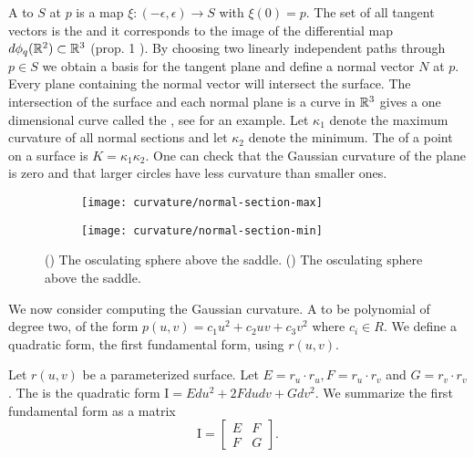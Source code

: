 A  to $S$ at $p$ is a map $\xi:(-\epsilon,\epsilon)\to S$ with $\xi(0)=p$.
The set of all tangent vectors is the  and it corresponds to the image
of the differential map $d\phi_q(\mathbb{R}^2)\subset \mathbb{R}^3$ (prop. 1 \cite{doc76}).
By choosing two linearly independent paths through $p\in S$ we obtain a basis 
for the tangent
plane and define a normal vector $N$ at $p$.
Every plane containing the normal vector will intersect the surface.
The intersection of the surface and each normal plane is a curve in $\mathbb{R}^3$
gives a one dimensional curve called the , see  
for an example.
Let $\kappa_1$ denote the maximum curvature of all normal sections 
and let $\kappa_2$ denote the minimum. 
The  of a point on a surface is
$K=\kappa_1\kappa_2.$
One can check that the Gaussian curvature of the plane is zero and
that larger circles have less curvature than smaller ones.



\begin{figure}[htb]
    \captionsetup[subfigure]{justification=centering}
    \centering
    \begin{subfigure}[b]{0.25\textwidth}
        \texttt{[image: curvature/normal-section-max]}
       \subcaption{}\label{fig:normal-section-max}
    \end{subfigure}
        \hspace{1cm}
        \begin{subfigure}[b]{0.25\textwidth}
        \texttt{[image: curvature/normal-section-min]}
        \subcaption{}\label{fig:normal-section-min}
        \end{subfigure}
    \caption{() The osculating sphere above the saddle.
        () The osculating sphere above the saddle.
    }
    \label{fig:normal-sections}
\end{figure}


We now consider computing the Gaussian curvature.
A  to be polynomial of degree two, of the form $p(u,v)=c_1u^2+c_2uv+c_3v^2$ 
where $c_i\in R$.
We define a quadratic form, the first fundamental form, using $r(u,v)$.

Let $r(u,v)$ be a parameterized surface.
Let $E=r_u\cdot r_u, F=r_u\cdot r_v$ and  $G=r_v\cdot r_v$.
The 
is the quadratic form $\mathrm{I}=Edu^2+2Fdudv +Gdv^2$.
We summarize the first fundamental form as a matrix $$\mathrm{I}=\begin{bmatrix}
E & F \\
F & G 
\end{bmatrix}.$$

